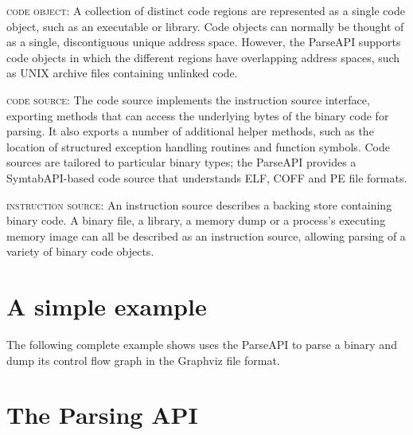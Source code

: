 \documentclass{article}
\begin{document}
%
\begin{itemize}[leftmargin=0pt,label=$\circ$]

{\item {\scshape code object}: A collection of distinct code regions are represented as a single code object, such as an executable or library. Code objects can normally be thought of as a single, discontiguous unique address space. However, the ParseAPI supports code objects in which the different regions have overlapping address spaces, such as UNIX archive files containing unlinked code.
}%

{\item {\scshape code source}: The code source implements the instruction source interface, exporting methods that can access the underlying bytes of the binary code for parsing. It also exports a number of additional helper methods, such as the location of structured exception handling routines and function symbols. Code sources are tailored to particular binary types; the ParseAPI provides a SymtabAPI-based code source that understands ELF, COFF and PE file formats.
}%

{\item {\scshape instruction source}: An instruction source describes a backing store containing binary code. A binary file, a library, a memory dump or a process's executing memory image can all be described as an instruction source, allowing parsing of a variety of binary code objects.
}%
\end{itemize}

\section{A simple example}
\label{sec:example}

The following complete example shows uses the ParseAPI to parse a binary and dump its control flow graph in the Graphviz file format.

\lstset{numbers=left, numberstyle=\tiny, stepnumber=5, numbersep=5pt}


\section{The Parsing API}
\label{sec:api}
\end{document}
